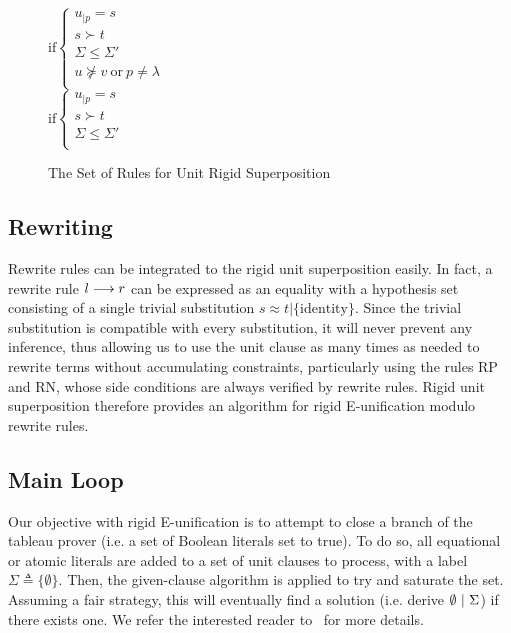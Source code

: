 \begin{figure}[htb]
\begin{center}
\doubleLine{}
\DP
$\text{if} \left\{\begin{array}{l}
u_{|p} = s\\
s \succ t\\
\Sigma \leq \Sigma'\\
u \not\succeq v ~ \text{or} ~ p \neq \lambda\\
\end{array}\right.$\\[12pt]

\doubleLine{}
\DP
$\text{if} \left\{\begin{array}{l}
u_{|p} = s\\
s \succ t\\
\Sigma \leq \Sigma'\\
\end{array}\right.$
\caption{The Set of Rules for Unit Rigid Superposition}
\label{fig:unit-sup-rules}
\end{center}
\end{figure}

\subsection{Rewriting}

Rewrite rules can be integrated to the rigid unit superposition easily. In fact,
a rewrite rule $l\longrightarrow{}r$ can be expressed as an equality with a hypothesis set
consisting of a single trivial substitution
$s\approx{}t|\{\text{identity}\}$. Since the trivial substitution is compatible
with every substitution, it will never prevent any inference, thus allowing us
to use the unit clause as many times as needed to rewrite terms without
accumulating constraints, particularly using the rules RP and RN, whose side
conditions are always verified by rewrite rules. Rigid unit superposition
therefore provides an algorithm for rigid E-unification modulo rewrite rules.

\subsection{Main Loop}

Our objective with rigid E-unification is to attempt to close a branch of the
tableau prover (i.e. a set of Boolean literals set to true). To do so, all
equational or atomic literals are added to a set of unit clauses to process,
with a label $\Sigma \triangleq \{ \emptyset \}$. Then, the given-clause
algorithm is applied to try and saturate the set. Assuming a fair strategy, this
will eventually find a solution (i.e. derive
$\emptyset ~|~ \Sigma$) if there exists one. We refer the
interested reader to~\cite{SS02} for more details.

